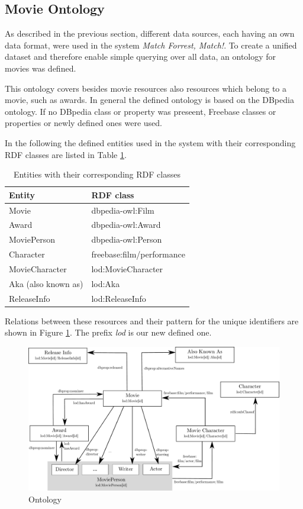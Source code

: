 \subsection{Movie Ontology}
\label{subsec_method_ontology}

As described in the previous section, different data sources, each having an own data format, were used in the system \emph{Match Forrest, Match!}.
To create a unified dataset and therefore enable simple querying over all data, an ontology for movies was defined.

This ontology covers besides movie resources also resources which belong to a movie, such as awards.
In general the defined ontology is based on the DBpedia ontology.
If no DBpedia class or property was preseent, Freebase classes or properties or newly defined ones were used.

In the following the defined entities used in the system with their corresponding RDF classes are listed in Table \ref{tab_entities}.

\begin{table}[ht]
	\begin{center}
	\begin{tabular}{ll}
		\textbf{Entity} & \textbf{RDF class} \\ \hline
		Movie & dbpedia-owl:Film \\
		Award & dbpedia-owl:Award \\
		MoviePerson & dbpedia-owl:Person \\
		Character & freebase:film/performance \\
		MovieCharacter & lod:MovieCharacter \\
		Aka (also known as) & lod:Aka \\
		ReleaseInfo & lod:ReleaseInfo \\
	\end{tabular}
	\end{center}
	\caption{Entities with their corresponding RDF classes}
	\label{tab_entities}
\end{table}

Relations between these resources and their pattern for the unique identifiers are shown in Figure \ref{fig_ontology}.
The prefix \textit{lod} is our new defined one.

\begin{figure}[h!]
\includegraphics[width=\textwidth]{images/ontology.pdf}
\caption{Ontology}
\label{fig_ontology}
\end{figure}

